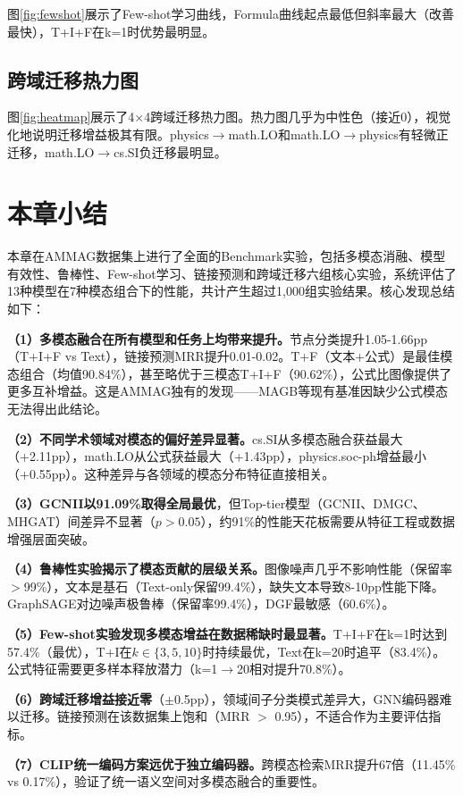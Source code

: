 图\ref{fig:fewshot}展示了Few-shot学习曲线，Formula曲线起点最低但斜率最大（改善最快），T+I+F在k=1时优势最明显。

\subsection{跨域迁移热力图}

图\ref{fig:heatmap}展示了4$\times$4跨域迁移热力图。热力图几乎为中性色（接近0），视觉化地说明迁移增益极其有限。physics$\to$math.LO和math.LO$\to$physics有轻微正迁移，math.LO$\to$cs.SI负迁移最明显。

\section{本章小结}

本章在AMMAG数据集上进行了全面的Benchmark实验，包括多模态消融、模型有效性、鲁棒性、Few-shot学习、链接预测和跨域迁移六组核心实验，系统评估了13种模型在7种模态组合下的性能，共计产生超过1,000组实验结果。核心发现总结如下：

\textbf{（1）多模态融合在所有模型和任务上均带来提升。}节点分类提升1.05-1.66pp（T+I+F vs Text），链接预测MRR提升0.01-0.02。T+F（文本+公式）是最佳模态组合（均值90.84\%），甚至略优于三模态T+I+F（90.62\%），公式比图像提供了更多互补增益。这是AMMAG独有的发现——MAGB\cite{yan2025magb}等现有基准因缺少公式模态无法得出此结论。

\textbf{（2）不同学术领域对模态的偏好差异显著。}cs.SI从多模态融合获益最大（+2.11pp），math.LO从公式获益最大（+1.43pp），physics.soc-ph增益最小（+0.55pp）。这种差异与各领域的模态分布特征直接相关。

\textbf{（3）GCNII以91.09\%取得全局最优}，但Top-tier模型（GCNII、DMGC、MHGAT）间差异不显著（$p > 0.05$），约91\%的性能天花板需要从特征工程或数据增强层面突破。

\textbf{（4）鲁棒性实验揭示了模态贡献的层级关系。}图像噪声几乎不影响性能（保留率$>$99\%），文本是基石（Text-only保留99.4\%），缺失文本导致8-10pp性能下降。GraphSAGE对边噪声极鲁棒（保留率99.4\%），DGF最敏感（60.6\%）。

\textbf{（5）Few-shot实验发现多模态增益在数据稀缺时最显著。}T+I+F在k=1时达到57.4\%（最优），T+I在$k \in \{3,5,10\}$时持续最优，Text在k=20时追平（83.4\%）。公式特征需要更多样本释放潜力（k=1$\to$20相对提升70.8\%）。

\textbf{（6）跨域迁移增益接近零}（$\pm$0.5pp），领域间子分类模式差异大，GNN编码器难以迁移。链接预测在该数据集上饱和（MRR $>$ 0.95），不适合作为主要评估指标。

\textbf{（7）CLIP统一编码方案远优于独立编码器。}跨模态检索MRR提升67倍（11.45\% vs 0.17\%），验证了统一语义空间对多模态融合的重要性。
